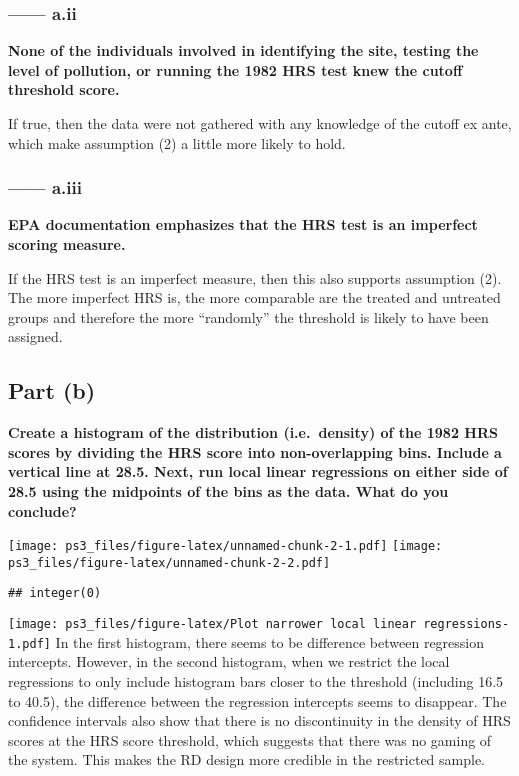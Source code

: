 \documentclass[
]{article}
\begin{document}
\hypertarget{a.ii}{%
\subsubsection{------ a.ii}\label{a.ii}}

\textbf{None of the individuals involved in identifying the site,
testing the level of pollution, or running the 1982 HRS test knew the
cutoff threshold score. }

If true, then the data were not gathered with any knowledge of the
cutoff ex ante, which make assumption (2) a little more likely to hold.

\hypertarget{a.iii}{%
\subsubsection{------ a.iii}\label{a.iii}}

\textbf{EPA documentation emphasizes that the HRS test is an imperfect
scoring measure. }

If the HRS test is an imperfect measure, then this also supports
assumption (2). The more imperfect HRS is, the more comparable are the
treated and untreated groups and therefore the more ``randomly'' the
threshold is likely to have been assigned.

\newpage

\hypertarget{part-b-1}{%
\subsection{Part (b)}\label{part-b-1}}

\textbf{Create a histogram of the distribution (i.e.~density) of the
1982 HRS scores by dividing the HRS score into non-overlapping bins.
Include a vertical line at 28.5. Next, run local linear regressions on
either side of 28.5 using the midpoints of the bins as the data. What do
you conclude?}

\texttt{[image: ps3\_files/figure-latex/unnamed-chunk-2-1.pdf]}
\texttt{[image: ps3\_files/figure-latex/unnamed-chunk-2-2.pdf]}

\begin{verbatim}
## integer(0)
\end{verbatim}

\texttt{[image: ps3\_files/figure-latex/Plot narrower local linear regressions-1.pdf]}
In the first histogram, there seems to be difference between regression
intercepts. However, in the second histogram, when we restrict the local
regressions to only include histogram bars closer to the threshold
(including 16.5 to 40.5), the difference between the regression
intercepts seems to disappear. The confidence intervals also show that
there is no discontinuity in the density of HRS scores at the HRS score
threshold, which suggests that there was no gaming of the system. This
makes the RD design more credible in the restricted sample.
\end{document}
